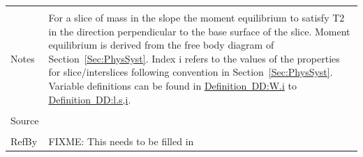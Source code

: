 \documentclass[12pt]{article}
\begin{document}
\begin{minipage}{\textwidth}
\begin{tabular}{p{} p{}}
\\ \midrule \\
Notes & For a slice of mass in the slope the moment equilibrium to satisfy T2 in the direction perpendicular to the base surface of the slice. Moment equilibrium is derived from the free body diagram of Section~\ref{Sec:PhysSyst}. Index i refers to the values of the properties for slice/interslices following convention in Section~\ref{Sec:PhysSyst}. Variable definitions can be found in \hyperref[DD:W.i]{Definition~DD:W.i} to \hyperref[DD:l.s,i]{Definition~DD:l.s,i}.
\\ \midrule \\
Source &
\\ \midrule \\
RefBy & FIXME: This needs to be filled in
\\ \bottomrule \end{tabular}
\end{minipage}\\
~\newline
\end{document}
